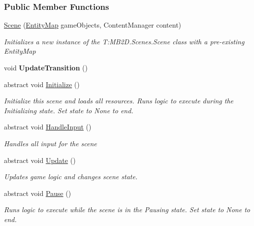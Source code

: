 \subsubsection*{Public Member Functions}
\begin{DoxyCompactItemize}
\item 
\hyperlink{class_m_b2_d_1_1_scenes_1_1_scene_ac9cb0c45a98614e7e4c1307ebb6ef85e}{Scene} (\hyperlink{class_m_b2_d_1_1_entity_component_1_1_entity_map}{Entity\+Map} game\+Objects, Content\+Manager content)
\begin{DoxyCompactList}\small\item\em Initializes a new instance of the T\+:\+M\+B2\+D.\+Scenes.\+Scene class with a pre-\/existing Entity\+Map \end{DoxyCompactList}\item 
\hypertarget{class_m_b2_d_1_1_scenes_1_1_scene_a3ac6e2ba061fc1ee7068921913de19fe}{}\label{class_m_b2_d_1_1_scenes_1_1_scene_a3ac6e2ba061fc1ee7068921913de19fe} 
void {\bfseries Update\+Transition} ()
\item 
abstract void \hyperlink{class_m_b2_d_1_1_scenes_1_1_scene_a081b4f8866936b495bdce388a7c96c25}{Initialize} ()
\begin{DoxyCompactList}\small\item\em Initialize this scene and loads all resources. Runs logic to execute during the Initializing state. Set state to None to end. \end{DoxyCompactList}\item 
abstract void \hyperlink{class_m_b2_d_1_1_scenes_1_1_scene_a476de5a885408d27ff151044d20738c8}{Handle\+Input} ()
\begin{DoxyCompactList}\small\item\em Handles all input for the scene \end{DoxyCompactList}\item 
abstract void \hyperlink{class_m_b2_d_1_1_scenes_1_1_scene_a779de7c1ab23b698dcde3a228324a991}{Update} ()
\begin{DoxyCompactList}\small\item\em Updates game logic and changes scene state. \end{DoxyCompactList}\item 
abstract void \hyperlink{class_m_b2_d_1_1_scenes_1_1_scene_a0661eff0223150fa8e9ea88145409e5d}{Pause} ()
\begin{DoxyCompactList}\small\item\em Runs logic to execute while the scene is in the Pausing state. Set state to None to end. \end{DoxyCompactList}\item 

\end{DoxyCompactItemize}

